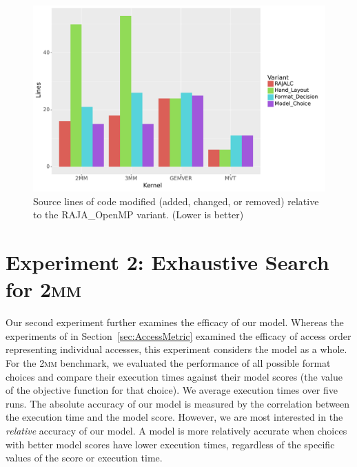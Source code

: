 \documentclass[sigconf,review=true]{acmart}
\begin{document}
\begin{figure}
	\includegraphics[width=\columnwidth]{PolybenchSLOC.pdf}
	\caption{Source lines of code modified (added, changed, or removed) relative to the RAJA\_OpenMP variant. (Lower is better)}
	\label{PolybenchSLOC}  
\end{figure}


\section{Experiment 2: Exhaustive Search for \textsc{2mm}}

Our second experiment further examines the efficacy of our model. 
Whereas the experiments of in Section~\ref{sec:AccessMetric} examined the efficacy of access order representing individual accesses, this experiment considers the model as a whole.
For the \textsc{2mm} benchmark, we evaluated the performance of all possible format choices and compare their execution times against their model scores (the value of the objective function for that choice).
We average execution times over five runs.
The absolute accuracy of our model is measured by the correlation between the execution time and the model score.
However, we are most interested in the \textit{relative} accuracy of our model.
A model is more relatively accurate when choices with better model scores have lower execution times, regardless of the specific values of the score or execution time.
\end{document}
